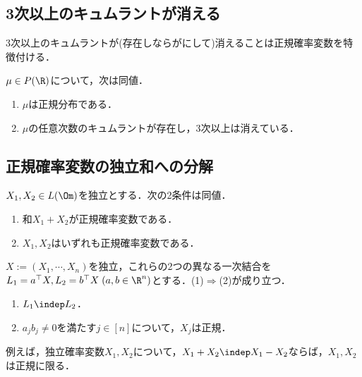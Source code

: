 \documentclass[uplatex,dvipdfmx]{jsreport}
\begin{document}
\subsection{3次以上のキュムラントが消える}

\begin{tcolorbox}[colframe=ForestGreen, colback=ForestGreen!10!white,breakable,colbacktitle=ForestGreen!40!white,coltitle=black,fonttitle=\bfseries\sffamily,
title=]
    3次以上のキュムラントが(存在しならがにして)消えることは正規確率変数を特徴付ける．
\end{tcolorbox}

\begin{theorem}
    $\mu\in P(\R)$について，次は同値．
    \begin{enumerate}
        \item $\mu$は正規分布である．
        \item $\mu$の任意次数のキュムラントが存在し，3次以上は消えている．
    \end{enumerate}
\end{theorem}

\subsection{正規確率変数の独立和への分解}

\begin{theorem}[Cramer (36)]
    $X_1,X_2\in L(\Om)$を独立とする．次の2条件は同値．
    \begin{enumerate}
        \item 和$X_1+X_2$が正規確率変数である．
        \item $X_1,X_2$はいずれも正規確率変数である．
    \end{enumerate}
\end{theorem}

\begin{theorem}
    $X:=(X_1,\cdots,X_n)$を独立，これらの2つの異なる一次結合を$L_1=a^\top X,L_2=b^{\top}X\;(a,b\in\R^n)$とする．(1)$\Rightarrow$(2)が成り立つ．
    \begin{enumerate}
        \item $L_1\indep L_2$．
        \item $a_jb_j\ne0$を満たす$j\in[n]$について，$X_j$は正規．
    \end{enumerate}
\end{theorem}
\begin{corollary}
    例えば，独立確率変数$X_1,X_2$について，$X_1+X_2\indep X_1-X_2$ならば，$X_1,X_2$は正規に限る．
\end{corollary}
\end{document}
